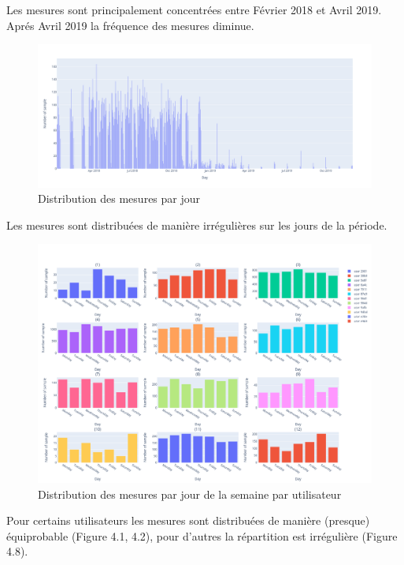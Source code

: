 \documentclass[10pt,a4paper]{article}
\begin{document}
Les mesures sont principalement concentrées entre Février 2018 et Avril 2019.
Aprés Avril 2019 la fréquence des mesures diminue.

\begin{figure}[H]
    \includegraphics[scale=0.3]{sample_per_day}
    \centering
    \caption{Distribution des mesures par jour}
    \label{fig:figure3}
\end{figure}

Les mesures sont distribuées de manière irrégulières sur les jours de la période.

\begin{figure}[H]
    \includegraphics[scale=0.3]{sample_per_week_day}
    \centering
    \caption{Distribution des mesures par jour de la semaine par utilisateur}
    \label{fig:figure4}
\end{figure}

Pour certains utilisateurs les mesures sont distribuées de manière (presque) équiprobable (Figure 4.1, 4.2),
pour d'autres la répartition est irrégulière (Figure 4.8).
\end{document}
